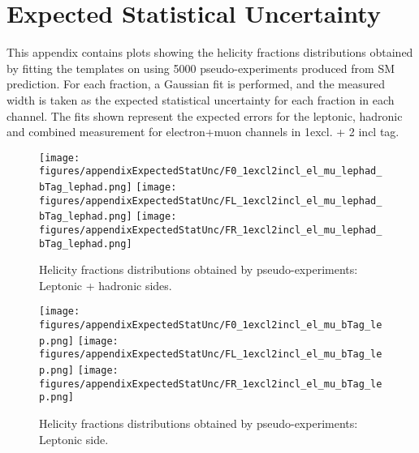 \clearpage
\section{Expected Statistical Uncertainty}
\label{app:expectedStatUnc}
This appendix contains plots showing the helicity fractions distributions obtained by fitting the templates on using 5000 pseudo-experiments produced from SM prediction. For each fraction, a Gaussian fit is performed, and the measured width is taken as the expected statistical uncertainty for each fraction in each channel. %
The fits shown represent the expected errors for the leptonic, hadronic and combined measurement for electron+muon channels in 1excl. + 2 incl \bt tag.

\begin{figure}[htbp]
\begin{center}
		\texttt{[image: figures/appendixExpectedStatUnc/F0\_1excl2incl\_el\_mu\_lephad\_bTag\_lephad.png]}
		\texttt{[image: figures/appendixExpectedStatUnc/FL\_1excl2incl\_el\_mu\_lephad\_bTag\_lephad.png]}
		\texttt{[image: figures/appendixExpectedStatUnc/FR\_1excl2incl\_el\_mu\_lephad\_bTag\_lephad.png]}
	\caption{Helicity fractions distributions obtained by pseudo-experiments: Leptonic + hadronic sides.}
	\label{fig:ExpectedStatUnc_lephad}
\end{center}	
\end{figure}


\begin{figure}[htbp]
\begin{center}
		\texttt{[image: figures/appendixExpectedStatUnc/F0\_1excl2incl\_el\_mu\_bTag\_lep.png]}
		\texttt{[image: figures/appendixExpectedStatUnc/FL\_1excl2incl\_el\_mu\_bTag\_lep.png]}
		\texttt{[image: figures/appendixExpectedStatUnc/FR\_1excl2incl\_el\_mu\_bTag\_lep.png]}
	\caption{Helicity fractions distributions obtained by pseudo-experiments: Leptonic side.}
	\label{fig:ExpectedStatUnc_lep}
\end{center}	
\end{figure}


